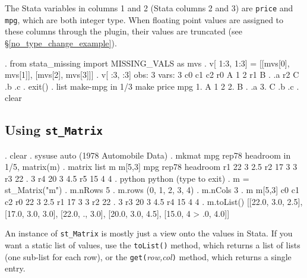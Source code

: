 \documentclass{article}
\begin{document}
\vspace{3mm}
The Stata variables in columns 1 and 2 (Stata columns 2 and 3) are \lstinline{price} and \lstinline{mpg}, which are both integer type. When floating point values are assigned to these columns through the plugin, their values are truncated (see \S\ref{no_type_change_example}).
\vspace{3mm}

\begin{stlog}
{\smallskip}
. from stata_missing import MISSING_VALS as mvs
{\smallskip}
. v[ 1:3, 1:3] = [[mvs[0], mvs[1]], [mvs[2], mvs[3]]]
{\smallskip}
. v[ :3, :3]
{\smallskip}
  obs: 3
 vars: 3
{\smallskip}
            c0        c1        c2
r0           A         1         2
r1           B         .        .a
r2           C        .b        .c
{\smallskip}
. exit()
{\smallskip}
. list make-mpg in 1/3
{\smallskip}
     {\TLC}
     {\VBAR} make   price   mpg {\VBAR}
     {\LFTT}
  1. {\VBAR} A          1     2 {\VBAR}
  2. {\VBAR} B          .    .a {\VBAR}
  3. {\VBAR} C         .b    .c {\VBAR}
     {\BLC}
{\smallskip}
. clear
\end{stlog}


\subsection{Using \lstinline{st_Matrix}} \label{st_Matrix_example}

\begin{stlog}
{\smallskip}
. clear
{\smallskip}
. sysuse auto
(1978 Automobile Data)
{\smallskip}
. mkmat mpg rep78 headroom in 1/5, matrix(m)
{\smallskip}
. matrix list m
{\smallskip}
m[5,3]
         mpg     rep78  headroom
r1        22         3       2.5
r2        17         3         3
r3        22         .         3
r4        20         3       4.5
r5        15         4         4
{\smallskip}
. python
 python (type {} to exit) 
. m = st_Matrix("m")
{\smallskip}
. m.nRows
5
{\smallskip}
. m.rows
(0, 1, 2, 3, 4)
{\smallskip}
. m.nCols
3
{\smallskip}
. m
{\smallskip}
m[5,3]
           c0         c1         c2
r0         22          3        2.5
r1         17          3          3
r2         22          .          3
r3         20          3        4.5
r4         15          4          4
{\smallskip}
. m.toList()
[[22.0, 3.0, 2.5], [17.0, 3.0, 3.0], [22.0, ., 3.0], [20.0, 3.0, 4.5], [15.0, 4
> .0, 4.0]]
\end{stlog}

An instance of \lstinline{st_Matrix} is mostly just a view onto the values in Stata. If you want a static list of values, use the \texttt{toList()} method, which returns a list of lists (one sub-list for each row), or the \lstinline{get(}\textit{row,col}\lstinline{)} method, which returns a single entry.
\smallskip
\end{document}
